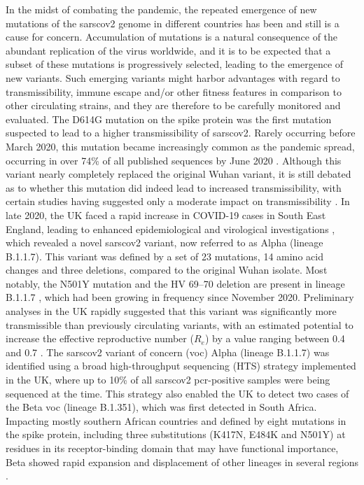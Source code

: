 In the midst of combating the pandemic, the repeated emergence of new mutations of the \gls{sarscov2} genome in different countries has been and still is a cause for concern.
Accumulation of mutations is a natural consequence of the abundant replication of the virus worldwide, and it is to be expected that a subset of these mutations is progressively selected, leading to the emergence of new variants.
Such emerging variants might harbor advantages with regard to transmissibility, immune escape and/or other fitness features in comparison to other circulating strains, and they are therefore to be carefully monitored and evaluated.
The D614G mutation on the spike protein was the first mutation suspected to lead to a higher transmissibility of \gls{sarscov2}.
Rarely occurring before March 2020, this mutation became increasingly common as the pandemic spread, occurring in over 74\% of all published sequences by June 2020 \citep{korber2020tracking,plante2021spike}.
Although this variant nearly completely replaced the original Wuhan variant, it is still debated as to whether this mutation did indeed lead to increased transmissibility, with certain studies having suggested only a moderate impact on transmissibility \citep{cogUKreport1,volz2021evaluating}.
In late 2020, the UK faced a rapid increase in COVID-19 cases in South East England, leading to enhanced epidemiological and virological investigations \citep{ecdcAlpha}, which revealed a novel \gls{sarscov2} variant, now referred to as Alpha (lineage B.1.1.7).
This variant was defined by a set of 23 mutations, 14 amino acid changes and three deletions, compared to the original Wuhan isolate.
Most notably, the N501Y mutation and the HV 69--70 deletion are present in lineage B.1.1.7 \citep{rambaut2020dynamic}, which had been growing in frequency since November 2020.
Preliminary analyses in the UK rapidly suggested that this variant was significantly more transmissible than previously circulating variants, with an estimated potential to increase the effective reproductive number ($R_e$) by a value ranging between 0.4 and 0.7 \citep{volz2021assessing}.
The \gls{sarscov2} variant of concern (\gls{voc}) Alpha (lineage B.1.1.7) was identified using a broad high-throughput sequencing (HTS) strategy implemented in the UK, where up to 10\% of all \gls{sarscov2} \gls{pcr}-positive samples were being sequenced at the time.
This strategy also enabled the UK to detect two cases of the Beta \gls{voc} (lineage B.1.351), which was first detected in South Africa.
Impacting mostly southern African countries and defined by eight mutations in the spike protein, including three substitutions (K417N, E484K and N501Y) at residues in its receptor-binding domain that may have functional importance, Beta showed rapid expansion and displacement of other lineages in several regions \citep{tegally2021detection}.
